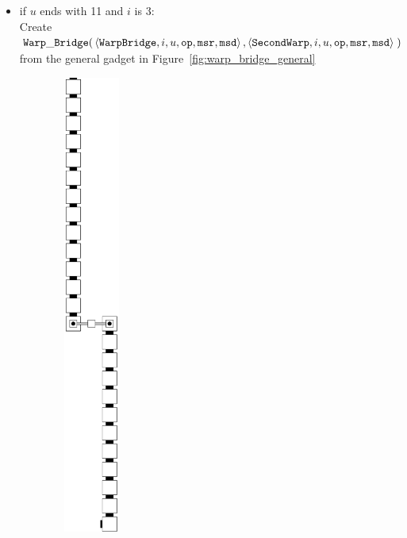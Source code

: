 \begin{itemize}
\begin{itemize}
            \item if $u$ ends with 11 and $i$ is 3: \\
            Create
            $\begin{aligned}[t]
                {\tt Warp\_Bridge}(& \left\langle {\tt WarpBridge}, i, u, {\tt op}, {\tt msr}, {\tt msd} \right\rangle,
                              \left\langle {\tt SecondWarp}, i, u, {\tt op}, {\tt msr}, {\tt msd} \right\rangle \;)
            \end{aligned}$ \\ from the general gadget in Figure~\ref{fig:warp_bridge_general}
            \vspace{.5cm}
        \end{itemize}

        \begin{figure}[H]
            \centering
            \begin{subfigure}[t]{0.2\textwidth}
                \centering
                \includegraphics[width=0.2\textwidth]{warping/warp_bridge_general}

\end{subfigure}
\end{figure}
\end{itemize}
